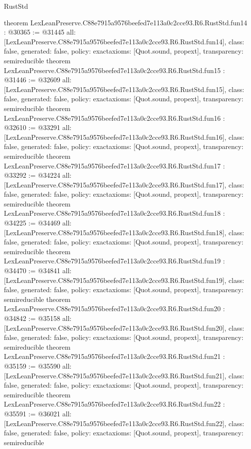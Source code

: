 \begin{lexlean}{RustStd}
\begin{coremodule}
{}
theorem LexLeanPreserve.C88e7915a9576beefed7e113a0c2cce93.R6.RustStd.fun14 : @30365 := @31445 {
  all: [LexLeanPreserve.C88e7915a9576beefed7e113a0c2cce93.R6.RustStd.fun14],
  class: false,
  generated: false,
  policy: exact{axioms: [Quot.sound, propext]},
  transparency: semireducible
}
theorem LexLeanPreserve.C88e7915a9576beefed7e113a0c2cce93.R6.RustStd.fun15 : @31446 := @32609 {
  all: [LexLeanPreserve.C88e7915a9576beefed7e113a0c2cce93.R6.RustStd.fun15],
  class: false,
  generated: false,
  policy: exact{axioms: [Quot.sound, propext]},
  transparency: semireducible
}
theorem LexLeanPreserve.C88e7915a9576beefed7e113a0c2cce93.R6.RustStd.fun16 : @32610 := @33291 {
  all: [LexLeanPreserve.C88e7915a9576beefed7e113a0c2cce93.R6.RustStd.fun16],
  class: false,
  generated: false,
  policy: exact{axioms: [Quot.sound, propext]},
  transparency: semireducible
}
theorem LexLeanPreserve.C88e7915a9576beefed7e113a0c2cce93.R6.RustStd.fun17 : @33292 := @34224 {
  all: [LexLeanPreserve.C88e7915a9576beefed7e113a0c2cce93.R6.RustStd.fun17],
  class: false,
  generated: false,
  policy: exact{axioms: [Quot.sound, propext]},
  transparency: semireducible
}
theorem LexLeanPreserve.C88e7915a9576beefed7e113a0c2cce93.R6.RustStd.fun18 : @34225 := @34469 {
  all: [LexLeanPreserve.C88e7915a9576beefed7e113a0c2cce93.R6.RustStd.fun18],
  class: false,
  generated: false,
  policy: exact{axioms: [Quot.sound, propext]},
  transparency: semireducible
}
theorem LexLeanPreserve.C88e7915a9576beefed7e113a0c2cce93.R6.RustStd.fun19 : @34470 := @34841 {
  all: [LexLeanPreserve.C88e7915a9576beefed7e113a0c2cce93.R6.RustStd.fun19],
  class: false,
  generated: false,
  policy: exact{axioms: [Quot.sound, propext]},
  transparency: semireducible
}
theorem LexLeanPreserve.C88e7915a9576beefed7e113a0c2cce93.R6.RustStd.fun20 : @34842 := @35158 {
  all: [LexLeanPreserve.C88e7915a9576beefed7e113a0c2cce93.R6.RustStd.fun20],
  class: false,
  generated: false,
  policy: exact{axioms: [Quot.sound, propext]},
  transparency: semireducible
}
theorem LexLeanPreserve.C88e7915a9576beefed7e113a0c2cce93.R6.RustStd.fun21 : @35159 := @35590 {
  all: [LexLeanPreserve.C88e7915a9576beefed7e113a0c2cce93.R6.RustStd.fun21],
  class: false,
  generated: false,
  policy: exact{axioms: [Quot.sound, propext]},
  transparency: semireducible
}
theorem LexLeanPreserve.C88e7915a9576beefed7e113a0c2cce93.R6.RustStd.fun22 : @35591 := @36021 {
  all: [LexLeanPreserve.C88e7915a9576beefed7e113a0c2cce93.R6.RustStd.fun22],
  class: false,
  generated: false,
  policy: exact{axioms: [Quot.sound, propext]},
  transparency: semireducible
}
\end{coremodule}
\end{lexlean}

